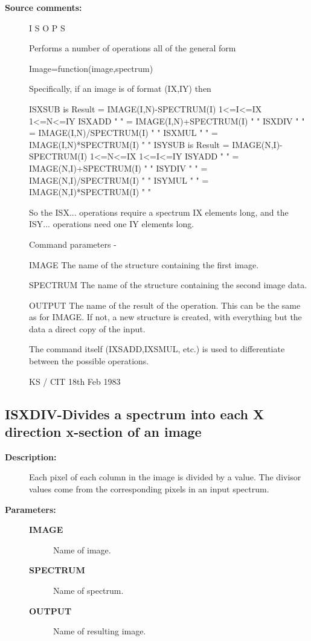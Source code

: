 \begin{description}
\begin{description}
\item [\textbf{Source comments:}]
\begin{terminalv}
 I S O P S

 Performs a number of operations all of the general form

 Image=function(image,spectrum)

 Specifically, if an image is of format (IX,IY) then

 ISXSUB is Result = IMAGE(I,N)-SPECTRUM(I) 1<=I<=IX 1<=N<=IY
 ISXADD  "   "    = IMAGE(I,N)+SPECTRUM(I)    "        "
 ISXDIV  "   "    = IMAGE(I,N)/SPECTRUM(I)    "        "
 ISXMUL  "   "    = IMAGE(I,N)*SPECTRUM(I)    "        "
 ISYSUB is Result = IMAGE(N,I)-SPECTRUM(I) 1<=N<=IX 1<=I<=IY
 ISYADD  "   "    = IMAGE(N,I)+SPECTRUM(I)    "        "
 ISYDIV  "   "    = IMAGE(N,I)/SPECTRUM(I)    "        "
 ISYMUL  "   "    = IMAGE(N,I)*SPECTRUM(I)    "        "

 So the ISX... operations require a spectrum IX elements long,
 and the ISY... operations need one IY elements long.

 Command parameters -

 IMAGE    The name of the structure containing the first image.

 SPECTRUM The name of the structure containing the second
          image data.

 OUTPUT   The name of the result of the operation.  This can
          be the same as for IMAGE.  If not, a new structure
          is created, with everything but the data a direct
          copy of the input.

 The command itself (IXSADD,IXSMUL, etc.) is used to
 differentiate between the possible operations.

                                  KS / CIT 18th Feb 1983
\end{terminalv}
\end{description}
\subsection{ISXDIV-\label{ISXDIV}Divides a spectrum into each X direction x-section of an image}
\begin{description}

\item [\textbf{Description:}]
 Each pixel of each column in the image is divided by a value.
 The divisor values come from the corresponding pixels in an
 input spectrum.

\item [\textbf{Parameters:}]
\begin{description}
\item [\textbf{IMAGE}]
 Name of image.
\item [\textbf{SPECTRUM}]
 Name of spectrum.
\item [\textbf{OUTPUT}]
 Name of resulting image.
\end{description}


\end{description}
\end{description}
